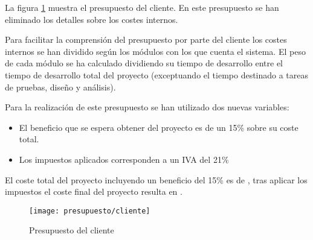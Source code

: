 La figura \ref{fig:presupuesto_cliente} muestra el presupuesto del cliente.  En este presupuesto se han eliminado los detalles sobre los costes internos.

Para facilitar la comprensión del presupuesto por parte del cliente los costes internos se han dividido según los módulos con los que cuenta el sistema.  El peso de cada módulo se ha calculado dividiendo su tiempo de desarrollo entre el tiempo de desarrollo total del proyecto (exceptuando el tiempo destinado a tareas de pruebas, diseño y análisis).

Para la realización de este presupuesto se han utilizado dos nuevas variables:
\begin{itemize}
	\item El beneficio que se espera obtener del proyecto es de un 15\% sobre su coste total.
	\item Los impuestos aplicados corresponden a un IVA del 21\%
\end{itemize}

El coste total del proyecto incluyendo un beneficio del 15\% es de , tras aplicar los impuestos el coste final del proyecto resulta en .

\begin{figure}[h]
	\centering
	\texttt{[image: presupuesto/cliente]}
	\caption{Presupuesto del cliente}
	\label{fig:presupuesto_cliente}
\end{figure}

